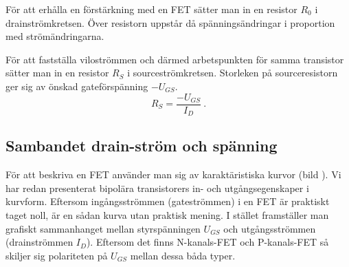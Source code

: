 För att erhålla en förstärkning med en FET sätter man in en resistor \(R_0\) i drainströmkretsen.
Över resistorn uppstår då spänningsändringar i proportion med strömändringarna.

För att fastställa viloströmmen och därmed arbetspunkten för samma transistor sätter man in en resistor \(R_S\) i sourceströmkretsen.
Storleken på sourceresistorn ger sig av önskad gateförspänning \(-U_{GS}\).
\[R_S = \dfrac{-U_{GS}}{I_D}~.\]


\newpage
\subsection{Sambandet drain-ström och spänning}

För att beskriva en FET använder man sig av karaktäristiska kurvor (bild ).
Vi har redan presenterat bipolära transistorers in- och utgångsegenskaper i kurvform.
Eftersom ingångsströmmen (gateströmmen) i en FET är praktiskt taget noll, är en sådan kurva utan praktisk mening.
I stället framställer man grafiskt sammanhanget mellan styrspänningen
\(U_{GS}\) och utgångsströmmen (drainströmmen \(I_D\)).
Eftersom det finns N-kanals-FET och P-kanals-FET så skiljer sig polariteten på \(U_{GS}\) mellan dessa båda typer.
